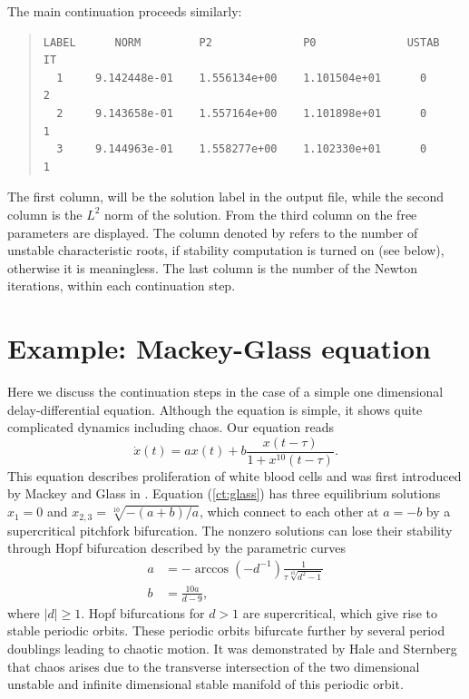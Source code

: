 \documentclass[10pt,a4paper]{ddedoc}
\begin{document}
The main continuation proceeds similarly:
{ \small \begin{quote} \begin{lstlisting}[basicstyle=\tt,frame=single]
LABEL      NORM         P2              P0              USTAB   IT
  1     9.142448e-01    1.556134e+00    1.101504e+01      0     2
  2     9.143658e-01    1.557164e+00    1.101898e+01      0     1
  3     9.144963e-01    1.558277e+00    1.102330e+01      0     1
\end{lstlisting} \end{quote} } \noindent
The first column,  will be the solution label in the output file, while the second column is the $L^2$ norm of the solution. From the third column on the free parameters are displayed. The column denoted by  refers to the number of unstable characteristic roots, if stability computation is turned on (see  below), otherwise it is meaningless. The last column is the number of the Newton iterations, within each continuation step.

\section{Example: Mackey-Glass equation}

Here we discuss the continuation steps in the case of a simple one dimensional
delay-differential equation. Although the equation is simple, it shows quite
complicated dynamics including chaos. Our equation reads
\begin{equation}
  \dot{x} ( t ) = ax ( t ) + b \frac{x ( t - \tau )}{1 + x^{10} ( t - \tau )}. \label{ct:glass}
\end{equation}
This equation describes proliferation of white blood cells and was first
introduced by Mackey and Glass in {\cite{mackey}}. Equation (\ref{ct:glass})
has three equilibrium solutions $x_1 = 0$ and $x_{2, 3} = \sqrt[10]{- ( a + b
) / a}$, which connect to each other at $a = - b$ by a supercritical pitchfork
bifurcation. The nonzero solutions can lose their stability through Hopf
bifurcation described by the parametric curves
\begin{align*}
  a & =-\arccos(-d^{-1}){\frac{1}{{\tau} {\sqrt[10]{d^2-1}}}}\\
  b & ={\frac{10a}{d-9}},
\end{align*}
where $|d| \ge 1$. Hopf bifurcations for $d > 1$ are supercritical, which give
rise to stable periodic orbits. These periodic orbits bifurcate further by
several period doublings leading to chaotic motion. It was demonstrated by
Hale and Sternberg {\cite{sternberg}} that chaos arises due to the transverse
intersection of the two dimensional unstable and infinite dimensional stable
manifold of this periodic orbit.
\end{document}
